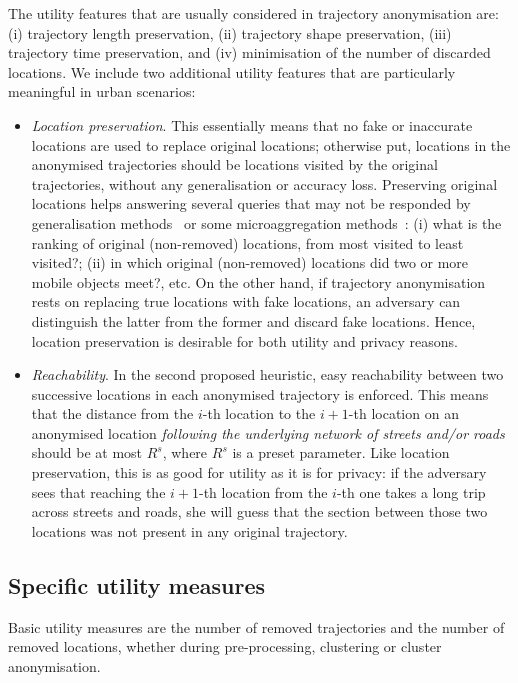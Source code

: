 The utility features that are usually considered in
trajectory anonymisation are: (i)
trajectory length preservation,
(ii) trajectory shape preservation, (iii)
trajectory time preservation, and (iv) minimisation of
the number of discarded locations. We include two additional
utility features that are particularly meaningful in urban scenarios:
\begin{itemize}
\item {\em Location preservation}.
This essentially means that no fake or inaccurate locations
are used to replace original locations; otherwise put,
locations in the anonymised trajectories should
be locations visited by the original trajectories, without
any generalisation or accuracy loss.
Preserving original locations helps answering several queries
that may not be responded by generalisation methods~\cite{monreale10}
or some microaggregation methods~\cite{abul08,abul10}:
(i) what is the ranking of original (non-removed) locations, from most visited
to least visited?; (ii) in which original (non-removed)
locations did two or more mobile
objects meet?, etc.
On the other hand, if trajectory anonymisation rests on replacing true
locations with
fake locations, an adversary can distinguish the latter from the former
and discard fake locations.
Hence, location preservation is desirable for both utility and privacy
reasons.
\item {\em Reachability}. In the second proposed heuristic,
easy reachability between two successive locations in each anonymised
trajectory is enforced. This means that
the distance from the $i$-th location
to the $i+1$-th location on an anonymised location {\em following
the underlying network of streets and/or roads}
should be at most $R^s$, where $R^s$ is a preset
parameter. Like location preservation, this is as good for utility
as it is for privacy: if the adversary sees that reaching the $i+1$-th
location from the $i$-th one takes a long trip across streets and roads,
she will guess that the section between those two locations was not
present in any original trajectory.
\end{itemize}

\subsection{Specific utility measures} \label{subsec:utility}


Basic utility measures are
the number of removed trajectories and the number of
removed locations, whether during pre-processing, clustering or cluster
anonymisation.

